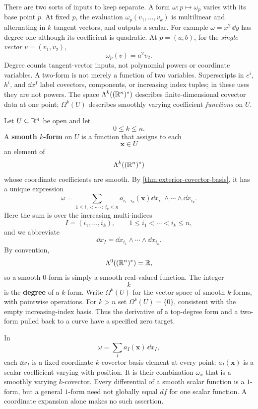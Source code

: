There are two sorts of inputs to keep separate. A form $\omega:p\mapsto
\omega_p$ varies with its base point $p$. At fixed $p$, the evaluation
$\omega_p(v_1,\ldots,v_k)$ is multilinear and alternating in $k$ tangent
vectors, and outputs a scalar. For example $\omega=x^2\,\dd y$ has
degree one although its coefficient is quadratic. At $p=(a,b)$, for
the \emph{single vector} $v=(v_1,v_2)$,
\[
\omega_p(v)=a^2v_2.
\]
Degree counts tangent-vector inputs, not polynomial powers or coordinate
variables. A two-form is not merely a function of two variables.
Superscripts in $e^i$, $h^i$, and $\dd x^I$ label covectors,
components, or increasing index tuples; in these uses they are not powers.
The space $\Lambda^k((\mathbb{R}^n)^*)$ describes finite-dimensional covector
data at one point; $\Omega^k(U)$ describes smoothly varying coefficient
\emph{functions} on $U$.

\begin{definition}
Let $U\subseteq\mathbb{R}^n$ be open and let
\[
0\leq k\leq n.
\]
A \textbf{smooth $k$-form} on $U$ is a function
that assigns to each
\[
\mathbf{x}\in U
\]
an element of
\[
\Lambda^k((\mathbb{R}^n)^*)
\]
whose coordinate coefficients are smooth. By
\cref{thm:exterior-covector-basis}, it has a unique expression
\[
\omega=
\sum_{1\leq i_1<\cdots<i_k\leq n}
a_{i_1\cdots i_k}(\mathbf{x})
\dd x_{i_1}\wedge\cdots\wedge\dd x_{i_k}.
\]
Here the sum is over the increasing multi-indices
\[
I=(i_1,\ldots,i_k),
\qquad
1\leq i_1<\cdots<i_k\leq n,
\]
and we abbreviate
\[
\dd x_I=\dd x_{i_1}\wedge\cdots\wedge\dd x_{i_k}.
\]
By convention,
\[
\Lambda^0((\mathbb{R}^n)^*)=\mathbb{R},
\]
so a smooth $0$-form is simply a smooth real-valued function.  The integer
\[
k
\]
is the \textbf{degree} of a $k$-form.
Write $\Omega^k(U)$ for the vector space of smooth $k$-forms, with
pointwise operations. For $k>n$ set $\Omega^k(U)=\{0\}$, consistent with
the empty increasing-index basis. Thus the derivative of a top-degree
form and a two-form pulled back to a curve have a specified zero target.
\end{definition}

In
\[
\omega=\sum_I a_I(\mathbf{x})\,\dd x_I,
\]
 each $\dd x_I$ is a fixed
coordinate $k$-covector basis element at every point; $a_I(\mathbf{x})$ is a scalar
coefficient varying with position. It is their combination $\omega_x$
that is a smoothly varying $k$-covector. Every differential of a smooth
scalar function is a $1$-form, but a general $1$-form need not globally
equal $df$ for one scalar function. A coordinate expansion alone makes
no such assertion.

